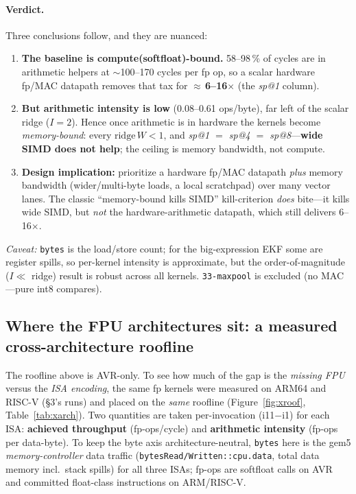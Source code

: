 \documentclass[11pt]{article}
\newcommand{\code}[1]{\texttt{#1}}
\begin{document}
\paragraph{Verdict.} Three conclusions follow, and they are nuanced:
\begin{enumerate}
  \item \textbf{The baseline is compute(softfloat)-bound.} 58--98\,\% of cycles are in arithmetic helpers
  at $\sim$100--170 cycles per fp op, so a scalar hardware fp/MAC datapath removes that tax for
  $\approx$\,\textbf{6--16$\times$} (the \emph{sp@1} column).
  \item \textbf{But arithmetic intensity is low} (0.08--0.61 ops/byte), far left of the scalar ridge
  ($I{=}2$). Hence once arithmetic is in hardware the kernels become \emph{memory-bound}: every
  $\text{ridge}\,W<1$, and \emph{sp@1 $=$ sp@4 $=$ sp@8}---\textbf{wide SIMD does not help}; the ceiling is
  memory bandwidth, not compute.
  \item \textbf{Design implication:} prioritize a hardware fp/MAC datapath \emph{plus} memory bandwidth
  (wider/multi-byte loads, a local scratchpad) over many vector lanes. The classic ``memory-bound kills
  SIMD'' kill-criterion \emph{does} bite---it kills wide SIMD, but \emph{not} the hardware-arithmetic
  datapath, which still delivers 6--16$\times$.
\end{enumerate}
\emph{Caveat:} \texttt{bytes} is the load/store count; for the big-expression EKF some are register spills,
so per-kernel intensity is approximate, but the order-of-magnitude ($I\ll$ ridge) result is robust across
all kernels. \code{33-maxpool} is excluded (no MAC---pure int8 compares).

\subsection{Where the FPU architectures sit: a measured cross-architecture roofline}\label{sec:xarch}
The roofline above is AVR-only. To see how much of the gap is the \emph{missing FPU} versus the
\emph{ISA encoding}, the same fp kernels were measured on ARM64 and RISC-V (\S3's runs) and placed on the
\emph{same} roofline (Figure~\ref{fig:xroof}, Table~\ref{tab:xarch}). Two quantities are taken
per-invocation (i11$-$i1) for each ISA: \textbf{achieved throughput} (fp-ops/cycle) and \textbf{arithmetic
intensity} (fp-ops per data-byte). To keep the byte axis architecture-neutral, \texttt{bytes} here is the
gem5 \emph{memory-controller} data traffic (\code{bytesRead/Written::cpu.data}, total data memory incl.\
stack spills) for all three ISAs; fp-ops are softfloat calls on AVR and committed float-class instructions
on ARM/RISC-V.
\end{document}
